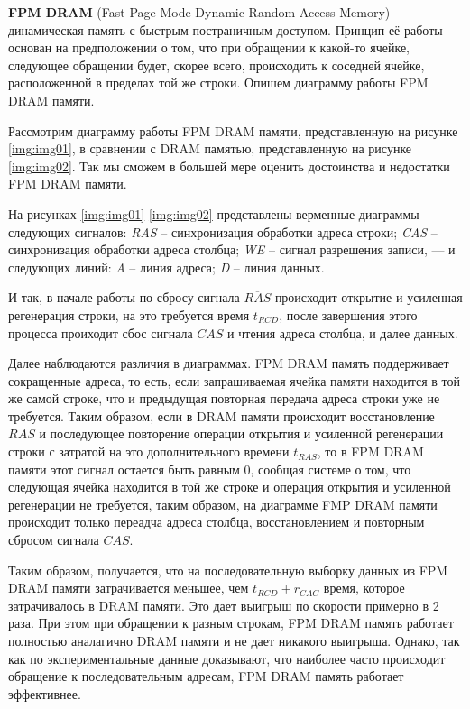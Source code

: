 \textbf{FPM DRAM} (Fast Page Mode Dynamic Random Access
Memory) --- динамическая память с быстрым постраничным
доступом. Принцип её работы основан на предположении о том, что
при обращении к какой-то ячейке, следующее обращении будет, скорее всего,
происходить к соседней ячейке, расположенной в пределах той же строки. Опишем
диаграмму работы FPM DRAM памяти.

Рассмотрим диаграмму работы FPM DRAM памяти, представленную на рисунке
\ref{img:img01}, в сравнении с DRAM памятью, представленную на рисунке
\ref{img:img02}. Так мы сможем в большей мере оценить достоинства и недостатки
FPM DRAM памяти.



На рисунках \ref{img:img01}-\ref{img:img02} представлены верменные диаграммы
следующих сигналов: \textit{RAS} -- синхронизация обработки адреса строки;
\textit{CAS} -- синхронизация обработки адреса столбца; \textit{WE} -- сигнал
разрешения записи, --- и следующих линий: \textit{A} -- линия адреса;
\textit{D} -- линия данных.

И так, в начале работы по сбросу сигнала $\overline{RAS}$ происходит открытие и
усиленная регенерация строки, на это требуется время $t_{RCD}$, после завершения
этого процесса проиходит сбос сигнала $\overline{CAS}$ и чтения адреса столбца, и
далее данных.

Далее наблюдаются различия в диаграммах. FPM DRAM память поддерживает
сокращенные адреса, то есть, если запрашиваемая ячейка памяти находится в той
же самой строке, что и предыдущая повторная передача адреса строки уже не
требуется. Таким образом, если в DRAM памяти происходит восстановление
$\overline{RAS}$ и последующее повторение операции открытия и усиленной
регенерации строки с затратой на это дополнительного времени $t_{RAS}$, то в
FPM DRAM памяти этот сигнал остается быть равным 0, сообщая системе о том, что
следующая ячейка находится в той же строке и операция открытия и усиленной
регенерации не требуется, таким образом, на диаграмме FMP DRAM памяти
происходит только переадча адреса столбца, восстановлением и повторным сбросом
сигнала $CAS$.

Таким образом, получается, что на последовательную выборку данных из FPM DRAM
памяти затрачивается меньшее, чем $t_{RCD}+r_{CAC}$ время, которое затрачивалось в
DRAM памяти. Это дает выигрыш по скорости примерно в 2 раза. При этом при
обращении к разным строкам, FPM DRAM память работает полностью аналагично DRAM
памяти и не дает никакого выигрыша. Однако, так как по экспериментальные данные
доказывают, что наиболее часто происходит обращение к последовательным адресам,
FPM DRAM память работает эффективнее.
